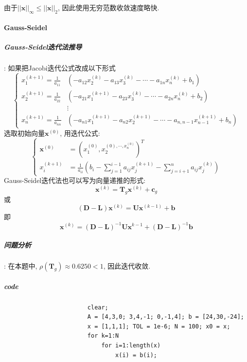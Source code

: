 \documentclass{article}
\begin{document}
\begin{CJK*}{UTF8}{song}
				
					由于$\left|\left|\mathbf{x} \right|\right|_{\infty} \leq \left|\left|\mathbf{x} \right|\right|_2$,
					因此使用无穷范数收敛速度略快.
			\paragraph{Gauss-Seidel}
				\subparagraph{Gauss-Seidel迭代法推导} :
					如果把Jacobi迭代公式改成以下形式
					$$\left\{
						\begin{aligned}
							x_1^{\left(k+1\right)} = \frac{1}{a_{11}}&\left(-a_{12}x_2^{\left(k\right)} -a_{13}x_3^{\left(k\right)} -\cdots - a_{1n}x_n^{\left(k\right)} +b_1\right) \\
							x_2^{\left(k+1\right)} = \frac{1}{a_{22}}&\left(-a_{21}x_1^{\left(k+1\right)} -a_{23}x_3^{\left(k\right)} -\cdots - a_{2n}x_n^{\left(k\right)} +b_2\right) \\
							&\vdots \\
							x_n^{\left(k+1\right)} = \frac{1}{a_{nn}}&\left(-a_{n1}x_1^{\left(k+1\right)} -a_{n2}x_2^{\left(k+1\right)} -\cdots - a_{n,n-1}x_{n-1}^{\left(k+1\right)} +b_n\right) 
						\end{aligned}
					\right.$$
					选取初始向量$\mathbf{x}^{\left(0\right)}$, 用迭代公式:
					$$\left\{
						\begin{aligned}
							\mathbf{x}^{\left(0\right)} &= \left(x_1^{\left(0\right)},x_2^{\left(0\right),\cdots,x_n^{\left(0\right)}}\right)^T \\
							x_i^{\left(k+1\right)} &= \frac{1}{a_{ii}}\left(b_i - \sum_{j=1}^{i-1}a_{ij}x_j^{\left(k+1\right)} - \sum_{j=i+1}^{n}a_{ij}x_j^{\left(k\right)} \right)
						\end{aligned}
					\right.$$
					Gauss-Seidel迭代法也可以写为向量递推的形式:
					$$\mathbf{x}^{\left(k\right)} = \mathbf{T}_g\mathbf{x}^{\left(k\right)} + \mathbf{c}_g$$
					或
					$$\left(\mathbf{D} - \mathbf{L}\right) \mathbf{x}^{\left(k\right)} = \mathbf{U} \mathbf{x}^{\left(k-1 \right)} + \mathbf{b}$$
					即
					$$ \mathbf{x}^{\left(k\right)} = \left(\mathbf{D} - \mathbf{L}\right)^{-1}\mathbf{U}\mathbf{x}^{k-1} + \left(\mathbf{D} - \mathbf{L}\right)^{-1}\mathbf{b}$$
				\subparagraph{问题分析}:\newline
				在本题中, $\rho \left(\mathbf{T}_g \right) \approx 0.6250 < 1$, 因此迭代收敛.
				\subparagraph{code}
					\begin{lstlisting}
						clear;
						A = [4,3,0; 3,4,-1; 0,-1,4]; b = [24,30,-24];
						x = [1,1,1]; TOL = 1e-6; N = 100; x0 = x;
						for k=1:N
							for i=1:length(x)
								x(i) = b(i);

\end{lstlisting}
\end{CJK*}
\end{document}

